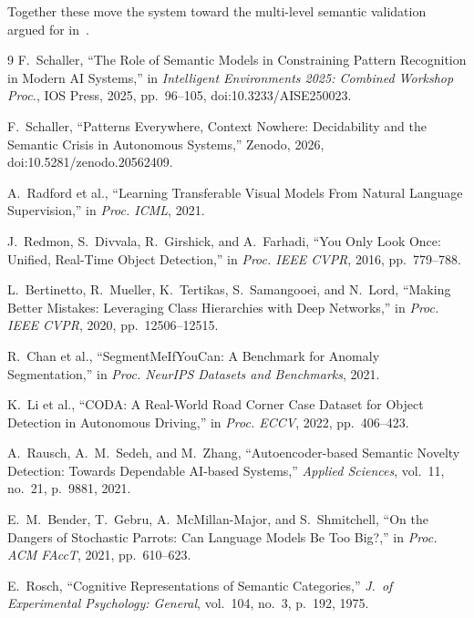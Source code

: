 \documentclass[conference]{IEEEtran}
\begin{document}
Together these move the system toward the multi-level semantic validation argued
for in~\cite{schaller2025}.

\newpage
\begin{thebibliography}{9}
F.~Schaller, ``The Role of Semantic Models in Constraining Pattern Recognition in
Modern AI Systems,'' in \emph{Intelligent Environments 2025: Combined Workshop
Proc.}, IOS Press, 2025, pp.~96--105, doi:10.3233/AISE250023.

F.~Schaller, ``Patterns Everywhere, Context Nowhere: Decidability and the
Semantic Crisis in Autonomous Systems,'' Zenodo, 2026,
doi:10.5281/zenodo.20562409.

A.~Radford et al., ``Learning Transferable Visual Models From Natural Language
Supervision,'' in \emph{Proc. ICML}, 2021.

J.~Redmon, S.~Divvala, R.~Girshick, and A.~Farhadi, ``You Only Look Once:
Unified, Real-Time Object Detection,'' in \emph{Proc. IEEE CVPR}, 2016,
pp.~779--788.

L.~Bertinetto, R.~Mueller, K.~Tertikas, S.~Samangooei, and N.~Lord, ``Making
Better Mistakes: Leveraging Class Hierarchies with Deep Networks,'' in
\emph{Proc. IEEE CVPR}, 2020, pp.~12506--12515.

R.~Chan et al., ``SegmentMeIfYouCan: A Benchmark for Anomaly Segmentation,'' in
\emph{Proc. NeurIPS Datasets and Benchmarks}, 2021.

K.~Li et al., ``CODA: A Real-World Road Corner Case Dataset for Object Detection
in Autonomous Driving,'' in \emph{Proc. ECCV}, 2022, pp.~406--423.

A.~Rausch, A.~M.~Sedeh, and M.~Zhang, ``Autoencoder-based Semantic Novelty
Detection: Towards Dependable AI-based Systems,'' \emph{Applied Sciences},
vol.~11, no.~21, p.~9881, 2021.

E.~M.~Bender, T.~Gebru, A.~McMillan-Major, and S.~Shmitchell, ``On the Dangers of
Stochastic Parrots: Can Language Models Be Too Big?,'' in \emph{Proc. ACM FAccT},
2021, pp.~610--623.

E.~Rosch, ``Cognitive Representations of Semantic Categories,'' \emph{J.\ of
Experimental Psychology: General}, vol.~104, no.~3, p.~192, 1975.
\end{thebibliography}
\end{document}
